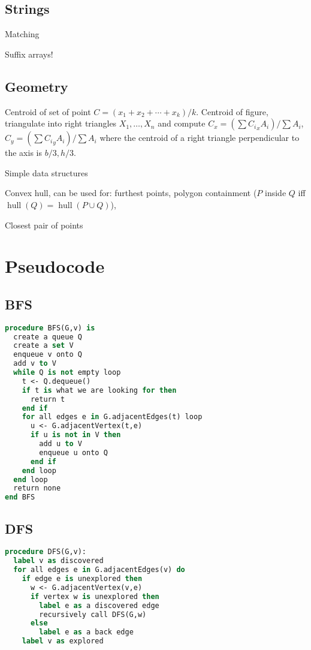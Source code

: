 \documentclass[10pt,a4paper]{article}
\newcommand{\codelisting}[1]{
  }
\begin{document}
\subsection*{Strings}
Matching
\codelisting{kmp.java}

Suffix arrays!
\codelisting{suffix.java}

\subsection*{Geometry}
Centroid of set of point $C = (x_1 + x_2 + \cdots + x_k) / k$.
Centroid of figure, triangulate into right triangles $X_1,\ldots,X_n$ and compute $C_x = (\sum {C_i}_x A_{i})/\sum A_i$, $C_y = (\sum {C_i}_y A_{i})/\sum A_i$ where the centroid of a right triangle perpendicular to the axis is $b/3,h/3$.

Simple data structures
\codelisting{Point.java}

Convex hull, can be used for: furthest points, polygon containment ($P$ inside $Q$ iff $\operatorname{hull}(Q)  = \operatorname{hull}(P\cup Q)$),
\codelisting{convexhull.java}

Closest pair of points
\codelisting{closestpoints.java}

\section*{Pseudocode}
\subsection*{BFS}
\begin{lstlisting}[language=Pascal]
procedure BFS(G,v) is
  create a queue Q
  create a set V
  enqueue v onto Q
  add v to V
  while Q is not empty loop
    t <- Q.dequeue()
    if t is what we are looking for then
      return t
    end if
    for all edges e in G.adjacentEdges(t) loop
      u <- G.adjacentVertex(t,e)
      if u is not in V then
        add u to V
        enqueue u onto Q
      end if
    end loop
  end loop
  return none
end BFS
\end{lstlisting}

\subsection*{DFS}
\begin{lstlisting}[language=Pascal]
procedure DFS(G,v):
  label v as discovered
  for all edges e in G.adjacentEdges(v) do
    if edge e is unexplored then
      w <- G.adjacentVertex(v,e)
      if vertex w is unexplored then
        label e as a discovered edge
        recursively call DFS(G,w)
      else
        label e as a back edge
    label v as explored
\end{lstlisting}
\end{document}
